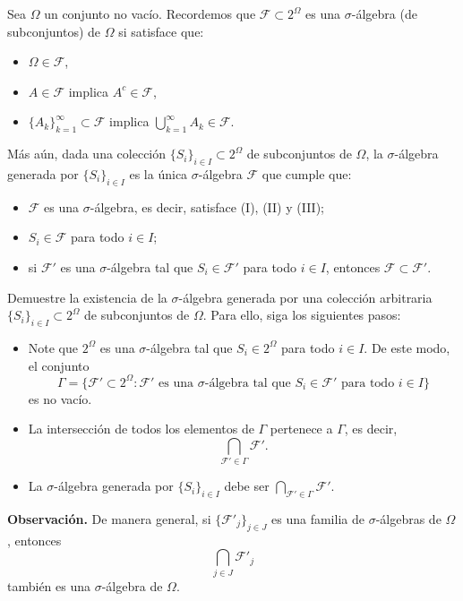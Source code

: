 \documentclass[12pt,a4paper]{article}
\begin{document}
    \begin{mdframed}[style=mdbluebox,frametitle={Ejercicio 6}]
        Sea $\Omega$ un conjunto no vacío. Recordemos que $\mathcal{F}\subset 2^{\Omega}$ es una
        $\sigma$-álgebra (de subconjuntos) de $\Omega$ si satisface que:
        \begin{itemize}
            \item[(I)] $\Omega \in \mathcal{F}$,
            \item[(II)] $A\in\mathcal{F}$ implica $A^{c}\in\mathcal{F}$,
            \item[(III)] $\{A_k\}_{k=1}^{\infty}\subset \mathcal{F}$ implica $\displaystyle\bigcup_{k=1}^{\infty}A_k \in \mathcal{F}$.
        \end{itemize}
        Más aún, dada una colección $\{S_i\}_{i\in I}\subset 2^{\Omega}$ de subconjuntos de $\Omega$, la $\sigma$-álgebra
        generada por $\{S_i\}_{i\in I}$ es la única $\sigma$-álgebra $\mathcal{F}$ que cumple que:
        \begin{itemize}
            \item[(a)] $\mathcal{F}$ es una $\sigma$-álgebra, es decir, satisface (I), (II) y (III);
            \item[(b)] $S_i\in\mathcal{F}$ para todo $i\in I$;
            \item[(c)] si $\mathcal{F}'$ es una $\sigma$-álgebra tal que $S_i\in\mathcal{F}'$ para todo $i\in I$, entonces $\mathcal{F}\subset \mathcal{F}'$.
        \end{itemize}

        Demuestre la existencia de la $\sigma$-álgebra generada por una colección arbitraria $\{S_i\}_{i\in I}\subset 2^{\Omega}$ de subconjuntos de $\Omega$. Para ello, siga los siguientes pasos:
        \begin{itemize}
        \item[(i)] Note que $2^{\Omega}$ es una $\sigma$-álgebra tal que $S_i\in 2^{\Omega}$ para todo $i\in I$. De este modo, el conjunto
        \[
            \Gamma=\{\mathcal{F}'\subset 2^{\Omega}:\mathcal{F}'\text{ es una }\sigma\text{-álgebra tal que }S_i\in\mathcal{F}'\text{ para todo }i\in I\}
        \]
        es no vacío.
        \item[(ii)] La intersección de todos los elementos de $\Gamma$ pertenece a $\Gamma$, es decir,
        \[
            \bigcap_{\mathcal{F}'\in\Gamma}\mathcal{F}'.
        \]
        \item[(iii)] La $\sigma$-álgebra generada por $\{S_i\}_{i\in I}$ debe ser $\displaystyle\bigcap_{\mathcal{F}'\in\Gamma}\mathcal{F}'$.
        \end{itemize}
        \textbf{Observación.} De manera general, si $\{\mathcal{F}'_j\}_{j\in J}$ es una familia de $\sigma$-álgebras de $\Omega$, entonces
        \[
            \bigcap_{j\in J}\mathcal{F}'_j
        \]
        también es una $\sigma$-álgebra de $\Omega$.
    \end{mdframed}
\end{document}
